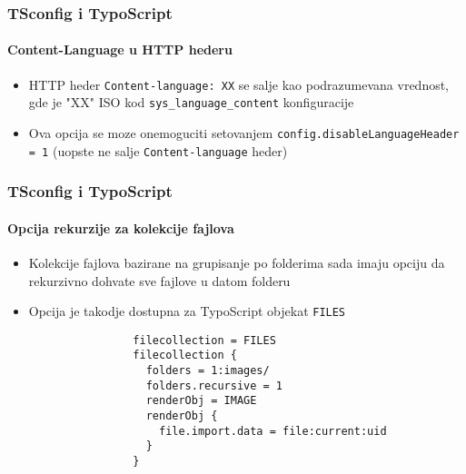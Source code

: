 
\begin{frame}[fragile]
	\frametitle{TSconfig i TypoScript}
	\framesubtitle{Content-Language u HTTP hederu}

	\begin{itemize}

		\item HTTP heder \texttt{Content-language: XX} se salje kao podrazumevana vrednost, gde je "XX" ISO kod \texttt{sys\_language\_content} konfiguracije

		\item Ova opcija se moze onemoguciti  setovanjem \texttt{config.disableLanguageHeader = 1}
			(uopste ne salje \texttt{Content-language} heder)

	\end{itemize}

\end{frame}


\begin{frame}[fragile]
	\frametitle{TSconfig i TypoScript}
	\framesubtitle{Opcija rekurzije za kolekcije fajlova}

	\begin{itemize}

		\item Kolekcije fajlova bazirane na grupisanje po folderima sada imaju opciju da rekurzivno dohvate sve fajlove u datom folderu

		\item Opcija je takodje dostupna za TypoScript objekat \texttt{FILES}

			\begin{lstlisting}
				filecollection = FILES
				filecollection {
				  folders = 1:images/
				  folders.recursive = 1
				  renderObj = IMAGE
				  renderObj {
				    file.import.data = file:current:uid
				  }
				}
			\end{lstlisting}

	\end{itemize}

\end{frame}

